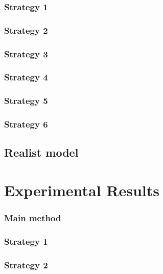 \documentclass[a4paper,10pt]{article}
\begin{document}
\subsubsection{Strategy 1}


\subsubsection{Strategy 2}


\subsubsection{Strategy 3}


\subsubsection{Strategy 4}


\subsubsection{Strategy 5}




\subsubsection{Strategy 6}



\subsection{Realist model} \label{realistic}


\newpage 

\section{Experimental Results} \label{Chapter4}
\subsubsection{Main method}


\subsubsection{Strategy 1}


\subsubsection{Strategy 2} 
\end{document}
